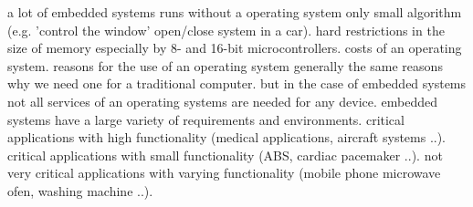 \bigskip
\bi
	\ite a lot of embedded systems runs without a operating system
	\bi
		\ite only  small algorithm (e.g. 'control the window' open/close system in a car).
		\ite hard restrictions in the size of memory especially by 8- and 16-bit microcontrollers.
		\ite costs of an operating system.
	\ei
	\bigskip
	\ite reasons for the use of an operating system
	\bi
		\ite generally the same reasons why we need one for a traditional computer.
		\ite but in the case of embedded systems not all services of an operating systems are needed for any device.
		\ite embedded systems have a large variety of requirements and environments.
		\bi
			\ite critical applications with high functionality (medical applications, aircraft systems ..).
			\ite critical applications with small functionality (ABS, cardiac pacemaker ..).
			\ite not very critical applications with varying functionality (mobile phone microwave ofen, washing machine ..).
		\ei

	\ei
\ei

